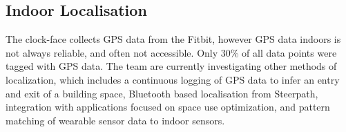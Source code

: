 










\subsection{Indoor Localisation}
\label{ch:localisation}

The clock-face collects GPS data from the Fitbit, however GPS data indoors is not always reliable, and often not accessible. Only 30\% of all data points were tagged with GPS data. The team are currently investigating other methods of localization, which includes a continuous logging of GPS data to infer an entry and exit of a building space, Bluetooth based localisation from Steerpath, integration with applications focused on space use optimization, and pattern matching of wearable sensor data to indoor sensors.

